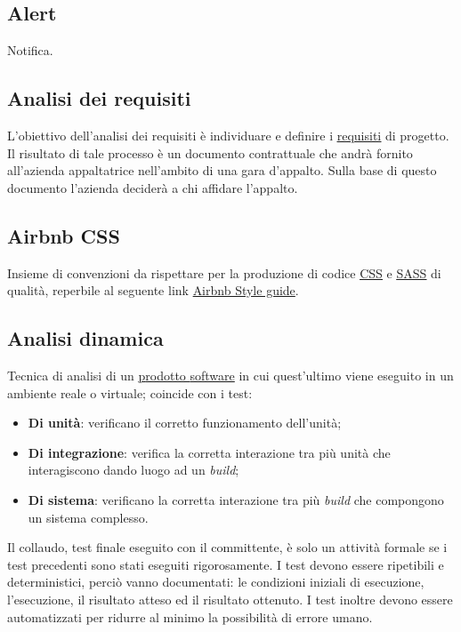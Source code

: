 	



\setcounter{secnumdepth}{0}
\usepackage{sectsty}
\sectionfont{\centering\fontsize{30}{30}\selectfont}



\copertina


\tableofcontents


	\newpage


	\subsection{Alert}
	\label{sec:alter}
	Notifica.

	\subsection{Analisi dei requisiti}
	\label{sec:analisirequisiti}
	L'obiettivo dell'analisi dei requisiti è individuare e definire i \underline{\hyperref[sec:requisito]{requisiti}} di progetto. Il risultato di tale processo è un documento contrattuale che andrà fornito all'azienda appaltatrice nell'ambito di una gara d'appalto. Sulla base di questo documento l'azienda deciderà a chi affidare l'appalto.
	\subsection{Airbnb CSS}
	\label{sec:airbnb}
	Insieme di convenzioni da rispettare per la produzione di codice \underline{\hyperref[sec:css]{CSS}} e \underline{\hyperref[sec:sass]{SASS}} di qualità, reperbile al seguente link \href{https://github.com/airbnb/css} {Airbnb Style guide}.
	\subsection{Analisi dinamica}
	\label{sec:analisidinamica}
	Tecnica di analisi di un \underline{\hyperref[sec:prodottosoftware]prodotto {software}} in cui quest'ultimo viene eseguito in un ambiente reale o virtuale; coincide con i test:
	\begin{itemize}
		\item \textbf{Di unità}: verificano il corretto funzionamento dell'unità;
		\item \textbf{Di integrazione}: verifica la corretta interazione tra più unità che interagiscono dando luogo ad un \emph{build};
		\item \textbf{Di sistema}: verificano la corretta interazione tra più \emph{build} che compongono un sistema complesso.
	\end{itemize}
	Il collaudo, test finale eseguito con il committente, è solo un attività formale se i test precedenti sono stati eseguiti rigorosamente. I test devono essere ripetibili e deterministici, perciò vanno documentati: le condizioni iniziali di esecuzione, l'esecuzione, il risultato atteso ed il risultato ottenuto. I test inoltre devono essere automatizzati per ridurre al minimo la possibilità di errore umano.

